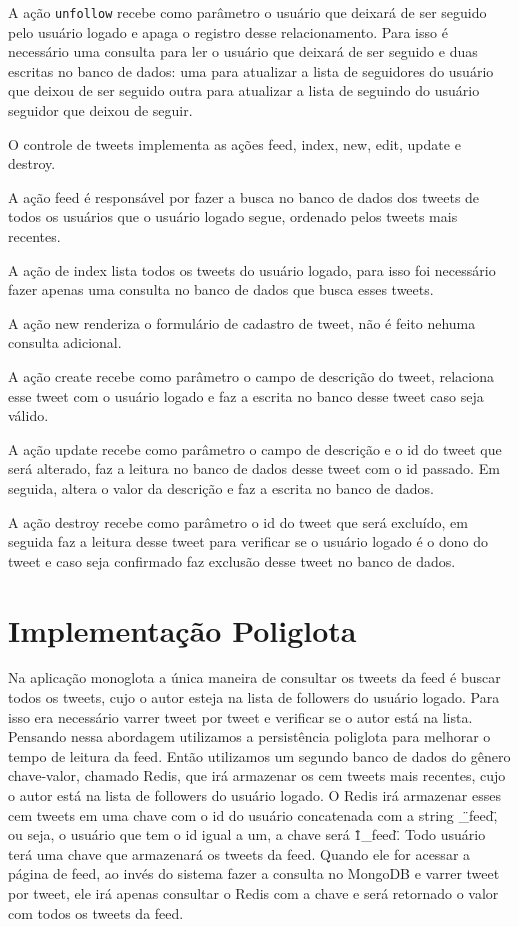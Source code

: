 A ação \verb|unfollow| recebe como parâmetro o usuário que deixará de ser seguido pelo usuário logado e apaga o registro desse relacionamento. Para isso é necessário uma consulta para ler o usuário que deixará de ser seguido e duas escritas no banco de dados: uma para atualizar a lista de seguidores do usuário que deixou de ser seguido outra para atualizar a lista de seguindo do usuário seguidor que deixou de seguir.

O controle de tweets implementa as ações feed, index, new, edit, update e destroy.

A ação feed é responsável por fazer a busca no banco de dados dos tweets de todos os usuários que o usuário logado segue, ordenado pelos tweets mais recentes.

A ação de index lista todos os tweets do usuário logado, para isso foi necessário fazer apenas uma consulta no banco de dados que busca esses tweets.

A ação new renderiza o formulário de cadastro de tweet, não é feito nehuma consulta adicional.

A ação create recebe como parâmetro o campo de descrição do tweet, relaciona esse tweet com o usuário logado e faz a escrita no banco desse tweet caso seja válido.

A ação update recebe como parâmetro o campo de descrição e o id do tweet que será alterado, faz a leitura no banco de dados desse tweet com o id passado. Em seguida, altera o valor da descrição e faz a escrita no banco de dados.

A ação destroy recebe como parâmetro o id do tweet que será excluído, em seguida faz a leitura desse tweet para verificar se o usuário logado é o dono do tweet e caso seja confirmado faz exclusão desse tweet no banco de dados.



\section{Implementação Poliglota}
\label{sec:polyglot}

Na aplicação monoglota a única maneira de consultar os tweets da feed é buscar todos os tweets, cujo o autor esteja na lista de followers do usuário logado. Para isso era necessário varrer tweet por tweet e verificar se o autor está na lista. Pensando nessa abordagem utilizamos a persistência poliglota para melhorar o tempo de leitura da feed.
Então utilizamos um segundo banco de dados do gênero chave-valor, chamado \ac{Redis}, que irá armazenar os cem tweets mais recentes, cujo o autor está na lista de followers do usuário logado.
O \ac{Redis} irá armazenar esses cem tweets em uma chave com o id do usuário concatenada com a string \"\_feed\", ou seja, o usuário que tem o id igual a um, a chave será \"1\_feed\". Todo usuário terá uma chave que armazenará os tweets da feed. Quando ele for acessar a página de feed, ao invés do sistema fazer a consulta no MongoDB e varrer tweet por tweet, ele irá apenas consultar o \ac{Redis} com a chave e será retornado o valor com todos os tweets da feed.



